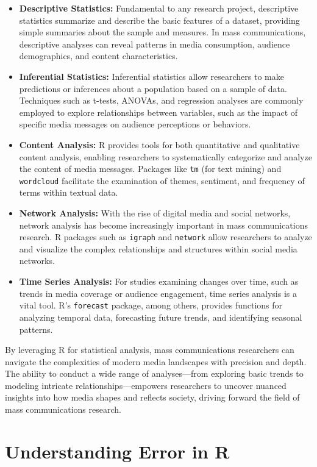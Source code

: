 \documentclass[
]{book}
\begin{document}
\begin{itemize}
\item
  \textbf{Descriptive Statistics:} Fundamental to any research project, descriptive statistics summarize and describe the basic features of a dataset, providing simple summaries about the sample and measures. In mass communications, descriptive analyses can reveal patterns in media consumption, audience demographics, and content characteristics.
\item
  \textbf{Inferential Statistics:} Inferential statistics allow researchers to make predictions or inferences about a population based on a sample of data. Techniques such as t-tests, ANOVAs, and regression analyses are commonly employed to explore relationships between variables, such as the impact of specific media messages on audience perceptions or behaviors.
\item
  \textbf{Content Analysis:} R provides tools for both quantitative and qualitative content analysis, enabling researchers to systematically categorize and analyze the content of media messages. Packages like \texttt{tm} (for text mining) and \texttt{wordcloud} facilitate the examination of themes, sentiment, and frequency of terms within textual data.
\item
  \textbf{Network Analysis:} With the rise of digital media and social networks, network analysis has become increasingly important in mass communications research. R packages such as \texttt{igraph} and \texttt{network} allow researchers to analyze and visualize the complex relationships and structures within social media networks.
\item
  \textbf{Time Series Analysis:} For studies examining changes over time, such as trends in media coverage or audience engagement, time series analysis is a vital tool. R's \texttt{forecast} package, among others, provides functions for analyzing temporal data, forecasting future trends, and identifying seasonal patterns.
\end{itemize}

By leveraging R for statistical analysis, mass communications researchers can navigate the complexities of modern media landscapes with precision and depth. The ability to conduct a wide range of analyses---from exploring basic trends to modeling intricate relationships---empowers researchers to uncover nuanced insights into how media shapes and reflects society, driving forward the field of mass communications research.

\section{Understanding Error in R}\label{understanding-error-in-r}
\end{document}
